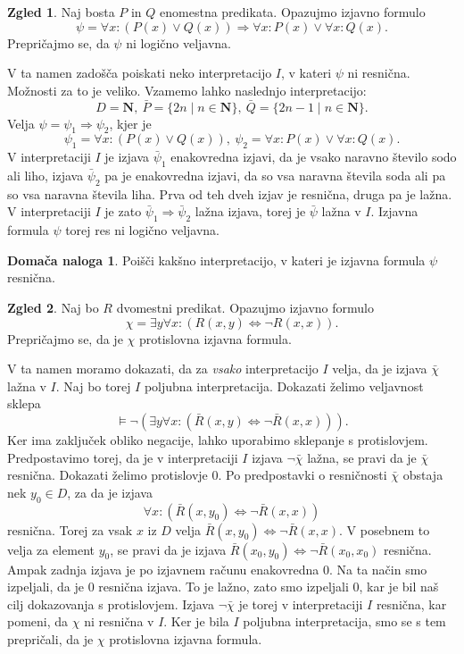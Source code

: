 \documentclass[11pt]{book}
\def\NN{\mathbf{N}}
\theoremstyle{definition}
\theoremstyle{zgled}
\newtheorem*{zgled}{Zgled}
\theoremstyle{odprtproblem}
\theoremstyle{domacanaloga}
\newtheorem*{domacanaloga}{Domača naloga}
\theoremstyle{izrek}
\begin{document}
\begin{zgled}
Naj bosta $P$ in $Q$ enomestna predikata. Opazujmo izjavno formulo
\[
    \psi = \forall x \colon (P(x) \lor Q(x)) \Rightarrow \forall x \colon P(x) \lor \forall x \colon Q(x).
\]
Prepričajmo se, da $\psi$ ni logično veljavna.

V ta namen zadošča poiskati neko interpretacijo $I$, v kateri $\psi$ ni resnična. Možnosti za to je veliko. Vzamemo lahko naslednjo interpretacijo:
\[
    D = \NN, \ \bar P = \{ 2 n \mid n \in \NN \}, \ \bar Q = \{ 2n - 1 \mid n \in \NN \}.
\]
Velja $\psi = \psi_1 \Rightarrow \psi_2$, kjer je 
\[
    \psi_1 = \forall x \colon (P(x) \lor Q(x)), \
    \psi_2 = \forall x \colon P(x) \lor \forall x \colon Q(x).
\]
V interpretaciji $I$ je izjava $\bar \psi_1$ enakovredna izjavi, da je vsako naravno število sodo ali liho, izjava $\bar \psi_2$ pa je enakovredna izjavi, da so vsa naravna števila soda ali pa so vsa naravna števila liha. Prva od teh dveh izjav je resnična, druga pa je lažna. V interpretaciji $I$ je zato $\bar \psi_1 \Rightarrow \bar \psi_2$ lažna izjava, torej je $\bar\psi$ lažna v $I$. Izjavna formula $\psi$ torej res ni logično veljavna.

\begin{domacanaloga}
    Poišči kakšno interpretacijo, v kateri je izjavna formula $\psi$ resnična.
\end{domacanaloga}
\end{zgled}

\begin{zgled}
Naj bo $R$ dvomestni predikat. Opazujmo izjavno formulo
\[
    \chi = \exists y \forall x \colon (R(x,y) \Leftrightarrow \lnot R(x,x)).
\]
Prepričajmo se, da je $\chi$ protislovna izjavna formula.

V ta namen moramo dokazati, da za \emph{vsako} interpretacijo $I$ velja, da je izjava $\bar \chi$ lažna v $I$. Naj bo torej $I$ poljubna interpretacija. Dokazati želimo veljavnost sklepa
\[
  \models \lnot \left( \exists y \forall x \colon (\bar R(x,y) \Leftrightarrow \lnot \bar R(x,x)) \right).
\]
Ker ima zaključek obliko negacije, lahko uporabimo sklepanje s protislovjem. Predpostavimo torej, da je v interpretaciji $I$ izjava $\lnot \bar \chi$ lažna, se pravi da je $\bar \chi$ resnična. Dokazati želimo protislovje $0$. Po predpostavki o resničnosti $\bar \chi$ obstaja nek $y_0 \in D$, za da je izjava 
\[
    \forall x \colon (\bar R(x, y_0) \Leftrightarrow \lnot \bar R(x,x))
\]
resnična. Torej za vsak $x$ iz $D$ velja $\bar R(x, y_0) \Leftrightarrow \lnot \bar R(x,x)$. V posebnem to velja za element $y_0$, se pravi da je izjava $\bar R(x_0, y_0) \Leftrightarrow \lnot \bar R(x_0,x_0)$ resnična. Ampak zadnja izjava je po izjavnem računu enakovredna $0$. Na ta način smo izpeljali, da je $0$ resnična izjava. To je lažno, zato smo izpeljali $0$, kar je bil naš cilj dokazovanja s protislovjem. Izjava $\lnot \bar \chi$ je torej v interpretaciji $I$ resnična, kar pomeni, da $\chi$ ni resnična v $I$. Ker je bila $I$ poljubna interpretacija, smo se s tem prepričali, da je $\chi$ protislovna izjavna formula.
\end{zgled}
\end{document}
